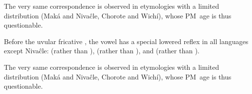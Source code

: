 \begin{exe}
    \ex \honeycomb
    \ex \daughter
    \ex \thorne
    \ex \namen
    \ex \distal
    \ex \mortar \label{e-mortar}
    \ex \rootn
    \ex \north
    \ex \welln
    \ex \monkparakeet
    \ex \sendv
    \ex \feminine
    \ex \earkfe
    \ex \arrowkaxe
    \ex \chaniarf
    \ex \chaniart
    \ex \offspring
    \ex \wash
    \ex \squash
    \ex \bow
    \ex \whitesnail
    \ex \firewoodlhet
    \ex \otter
    \ex \cavy
    \ex \hear
    \ex \rain
    \ex \fatpe
    \ex \beard
    \ex \costume
    \ex \spank
    \ex \whitequebracho
    \ex \eyelash
    \ex \eye
    \ex \plate
    \ex \eyebrow
    \ex \tooth
    \ex \tears
    \ex \rheum
    \ex \bromelia
    \ex \belly
    \ex \walk
    \ex \headn
    \ex \bat \label{e-bat}
    \ex \jelayuk
    \ex \shadow
    \ex \moon
    \ex \wildhoney
    \ex \femalebreast
    \ex \mosquito \label{e-mosquito}
    \ex \teach
    \ex \parrot
    \ex \othern
\end{exe}

The very same correspondence is observed in etymologies with a limited distribution (Maká and Nivaĉle, Chorote and Wichí), whose PM~age is thus questionable.

\begin{exe}
    \ex \jar
    \ex \inhabitant
    \ex \grandchild
    \ex \earcw
    \ex \pacu
    \ex \heartmn
    \ex \skycloud
    \ex \gutscw
    \ex \chachalaca
    \ex \saymn
    \ex \ashamedmn
    \ex \cloudmn
    \ex \onemn
    \ex \leafhaircw
    \ex \dirt
    \ex \orphanmn
    \ex \hiccup
    \ex \heartcw
\end{exe}

Before the uvular fricative , the vowel  has a special lowered reflex in all languages except Nivaĉle:  (rather than ),  (rather than ), and  (rather than ).

\begin{exe}
    \ex \fatv
    \ex \jabiru
    \ex \quick
    \ex \longv
    \ex \fullriver
    \ex \blackalgarrobof
    \ex \peccary
    \ex \hurt
    \ex \chaguara
    \ex \wildbean
    \ex \mistolf
    \ex \puma
\end{exe}

The very same correspondence is observed in etymologies with a limited distribution (Maká and Nivaĉle, Chorote and Wichí), whose PM~age is thus questionable.

\begin{exe}
    \ex \smoke
    \ex \mollef
\end{exe}

